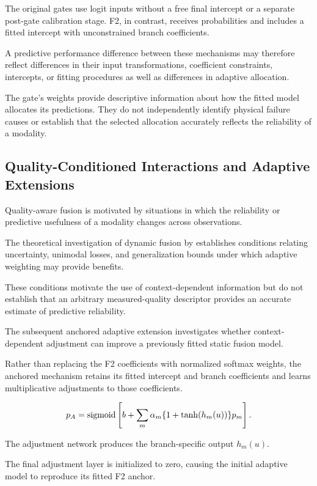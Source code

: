 The original gates use logit inputs without a free final intercept or a separate post-gate calibration stage. F2, in contrast, receives probabilities and includes a fitted intercept with unconstrained branch coefficients.

A predictive performance difference between these mechanisms may therefore reflect differences in their input transformations, coefficient constraints, intercepts, or fitting procedures as well as differences in adaptive allocation.

The gate’s weights provide descriptive information about how the fitted model allocates its predictions. They do not independently identify physical failure causes or establish that the selected allocation accurately reflects the reliability of a modality.

\subsection{Quality-Conditioned Interactions and Adaptive Extensions}

Quality-aware fusion is motivated by situations in which the reliability or predictive usefulness of a modality changes across observations.

The theoretical investigation of dynamic fusion by \textcite{Zhang2023QMF} establishes conditions relating uncertainty, unimodal losses, and generalization bounds under which adaptive weighting may provide benefits.

These conditions motivate the use of context-dependent information but do not establish that an arbitrary measured-quality descriptor provides an accurate estimate of predictive reliability.

The subsequent anchored adaptive extension investigates whether context-dependent adjustment can improve a previously fitted static fusion model.

Rather than replacing the F2 coefficients with normalized softmax weights, the anchored mechanism retains its fitted intercept and branch coefficients and learns multiplicative adjustments to those coefficients.

\begin{equation}
 p_A=\operatorname{sigmoid}\left[b+\sum_m\alpha_m\{1+\tanh(h_m(u))\}p_m\right].
 \label{eq:anchored}
\end{equation}

The adjustment network produces the branch-specific output \(h_m(u)\).

The final adjustment layer is initialized to zero, causing the initial adaptive model to reproduce its fitted F2 anchor.

